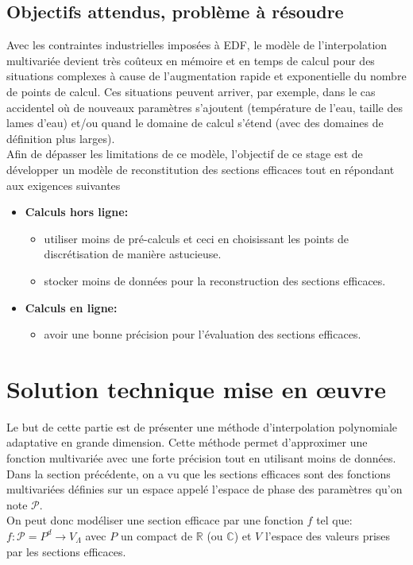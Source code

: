 \subsection{Objectifs attendus, problème à résoudre}\label{sec:3.2}
\hspace{0.5cm}
Avec les contraintes industrielles imposées à EDF, le modèle de l'interpolation multivariée devient très coûteux en mémoire et en temps de calcul pour des situations complexes à cause de l'augmentation rapide et exponentielle du nombre de points de calcul. Ces situations peuvent arriver, par exemple, dans le cas accidentel où de nouveaux paramètres s'ajoutent (température de l'eau, taille des lames d'eau) et/ou quand le domaine de calcul s'étend (avec des domaines de définition plus larges). \\
Afin de dépasser les limitations de ce modèle, l'objectif de ce stage est de développer un modèle de reconstitution des sections efficaces tout en répondant aux exigences suivantes

\begin{itemize}
		\item \textbf{Calculs hors ligne:}
		\begin{itemize}
				\item utiliser moins de pré-calculs et ceci en choisissant les points de discrétisation de manière astucieuse.
				\item stocker moins de données pour la reconstruction des sections efficaces.
		\end{itemize}
		\item \textbf{Calculs en ligne:} 
		\begin{itemize}
				\item avoir une bonne précision pour l'évaluation des sections efficaces.
		\end{itemize}
\end{itemize}

\section{Solution technique mise en œuvre}\label{sec:4}
\hspace{0.5cm}
Le but de cette partie est de présenter une méthode d'interpolation polynomiale adaptative en grande dimension.
Cette méthode permet d'approximer une fonction multivariée avec une forte précision tout en
utilisant moins de données. \\

Dans la section précédente, on a vu que les sections efficaces sont des fonctions multivariées définies sur un espace appelé l'espace de phase des paramètres qu'on note $\mathcal{P}$. \\
On peut donc modéliser une section efficace par une fonction $f$ tel que: \\
$f:\mathcal{P} = P^d \rightarrow V_{\Lambda}$ avec $P$ un compact de $\mathbb{R}$ (ou $\mathbb{C}$) et $V$ l'espace des valeurs prises par les sections efficaces. \\

